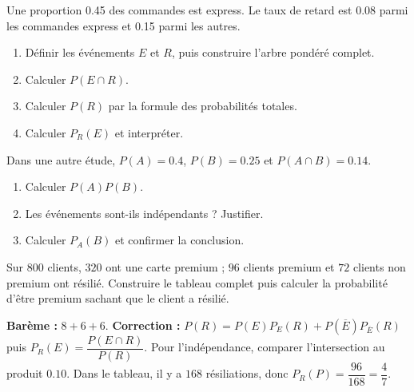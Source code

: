 \begin{exercise}
Une proportion \num{0,45} des commandes est express. Le taux de retard est \num{0,08} parmi les commandes express et \num{0,15} parmi les autres.
\begin{enumerate}
\item Définir les événements $E$ et $R$, puis construire l'arbre pondéré complet.
\item Calculer $P(E\cap R)$.
\item Calculer $P(R)$ par la formule des probabilités totales.
\item Calculer $P_R(E)$ et interpréter.
\end{enumerate}
\end{exercise}
\begin{exercise}[2 -- Indépendance]
Dans une autre étude, $P(A)=\num{0,4}$, $P(B)=\num{0,25}$ et $P(A\cap B)=\num{0,14}$.
\begin{enumerate}
\item Calculer $P(A)P(B)$.
\item Les événements sont-ils indépendants ? Justifier.
\item Calculer $P_A(B)$ et confirmer la conclusion.
\end{enumerate}
\end{exercise}
\begin{exercise}
Sur $800$ clients, $320$ ont une carte premium ; $96$ clients premium et $72$ clients non premium ont résilié. Construire le tableau complet puis calculer la probabilité d'être premium sachant que le client a résilié.
\end{exercise}
\begin{solution}\textbf{Barème :} $8+6+6$. \textbf{Correction :} $P(R)=P(E)P_E(R)+P(\overline E)P_{\overline E}(R)$ puis $P_R(E)=\dfrac{P(E\cap R)}{P(R)}$. Pour l'indépendance, comparer l'intersection au produit $\num{0,10}$. Dans le tableau, il y a $168$ résiliations, donc $P_R(P)=\dfrac{96}{168}=\dfrac47$.\end{solution}

